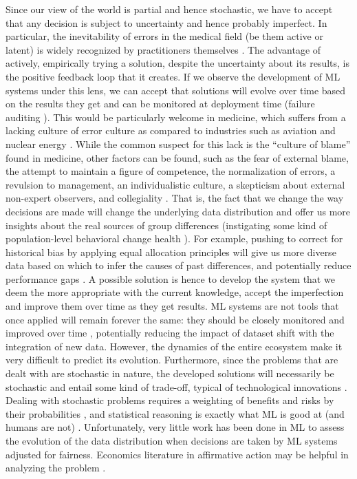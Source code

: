     Since our view of the world is partial and hence stochastic, we have to accept that any decision is subject to uncertainty and hence probably imperfect.
    In particular, the inevitability of errors in the medical field (be them active or latent) is widely recognized by practitioners themselves \cite{Waring2005}.
    The advantage of actively, empirically trying a solution, despite the uncertainty about its results, is the positive feedback loop that it creates.
    If we observe the development of ML systems under this lens, we can accept that solutions will evolve over time based on the results they get and can be monitored at deployment time (failure auditing \cite{Chen2021}).
    This would be particularly welcome in medicine, which suffers from a lacking culture of error culture as compared to industries such as aviation and nuclear energy \cite{Waring2005}.
    While the common suspect for this lack is the ``culture of blame'' found in medicine, other factors can be found, such as the fear of external blame, the attempt to maintain a figure of competence, the normalization of errors, a revulsion to management, an individualistic culture, a skepticism about external non-expert observers, and collegiality \cite{Waring2005}.
    That is, the fact that we change the way decisions are made will change the underlying data distribution and offer us more insights about the real sources of group differences (instigating some kind of population-level behavioral change health \cite[p.~5]{Morley2020}).
    For example, pushing to correct for historical bias by applying equal allocation principles \cite[p.~6]{Rajkomar2018} will give us more diverse data based on which to infer the causes of past differences, and potentially reduce performance gaps \cite{Chen2021}.
    A possible solution is hence to develop the system that we deem the more appropriate with the current knowledge, accept the imperfection and improve them over time as they get results.
    ML systems are not tools that once applied will remain forever the same: they should be closely monitored and improved over time \cite[p.~7]{Rajkomar2018}, potentially reducing the impact of dataset shift with the integration of new data.
    However, the dynamics of the entire ecosystem make it very difficult to predict its evolution.
    Furthermore, since the problems that are dealt with are stochastic in nature, the developed solutions will necessarily be stochastic and entail some kind of trade-off, typical of technological innovations \cite{Hardin1989}.
    Dealing with stochastic problems requires a weighting of benefits and risks by their probabilities \cite{Hardin1989}, and statistical reasoning is exactly what ML is good at (and humans are not) \cite{Williamson2021}.
    Unfortunately, very little work has been done in ML to assess the evolution of the data distribution when decisions are taken by ML systems adjusted for fairness.
    Economics literature in affirmative action may be helpful in analyzing the problem \cite{Chouldechova2020}.



